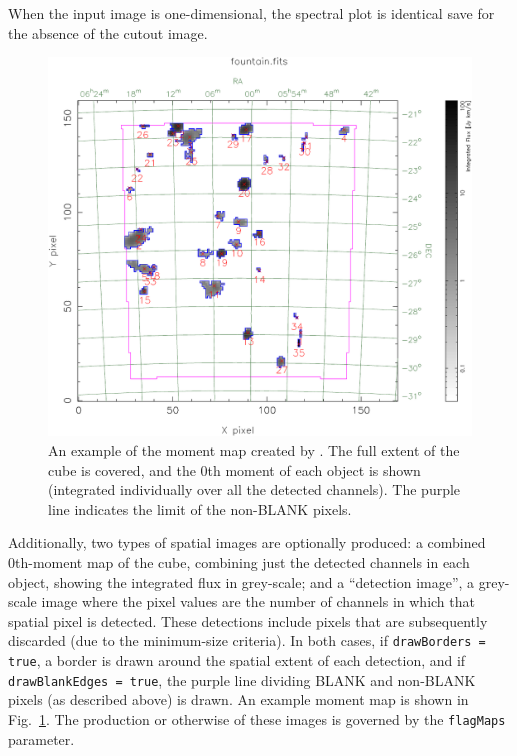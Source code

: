 When the input image is one-dimensional, the spectral plot is
identical save for the absence of the cutout image.

\label{sec-spatialmaps}

\begin{figure}[!t]
  \begin{center}
    \includegraphics[width=\textwidth]{example_moment_map}
  \end{center}
  \caption{\footnotesize An example of the moment map created by
    \duchamp. The full extent of the cube is covered, and the 0th moment
    of each object is shown (integrated individually over all the
    detected channels). The purple line indicates the limit of the
    non-BLANK pixels.}
  \label{fig-moment}
\end{figure}

Additionally, two types of spatial images are optionally produced: a
combined 0th-moment map of the cube, combining just the detected
channels in each object, showing the integrated flux in grey-scale;
and a ``detection image'', a grey-scale image where the pixel values
are the number of channels in which that spatial pixel is
detected. These detections include pixels that are subsequently
discarded (due to the minimum-size criteria). In both cases, if
\texttt{drawBorders = true}, a border is drawn around the spatial
extent of each detection, and if \texttt{drawBlankEdges = true}, the
purple line dividing BLANK and non-BLANK pixels (as described above)
is drawn. An example moment map is shown in Fig.~\ref{fig-moment}.
The production or otherwise of these images is governed by the
\texttt{flagMaps} parameter.

